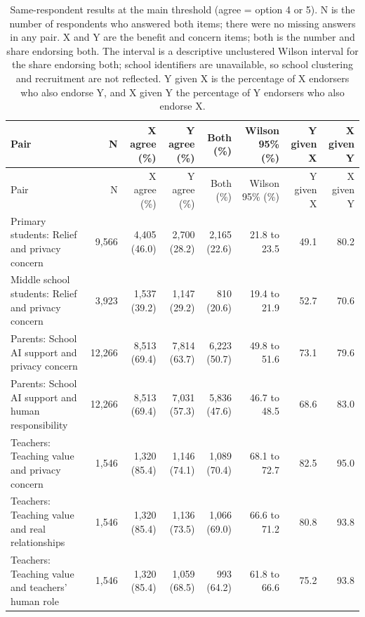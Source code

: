 \begin{longtable}{@{}p{}rrrrrrr@{}}
\caption{Same-respondent results at the main threshold (agree = option 4 or 5). N is the number of respondents who answered both items; there were no missing answers in any pair. X and Y are the benefit and concern items; both is the number and share endorsing both. The interval is a descriptive unclustered Wilson interval for the share endorsing both; school identifiers are unavailable, so school clustering and recruitment are not reflected. Y given X is the percentage of X endorsers who also endorse Y, and X given Y the percentage of Y endorsers who also endorse X.}\label{tab:joint_main}\\
\toprule Pair & N & X agree (\%) & Y agree (\%) & Both (\%) & Wilson 95\% (\%) & Y given X & X given Y \\ \midrule \endfirsthead
\toprule Pair & N & X agree (\%) & Y agree (\%) & Both (\%) & Wilson 95\% (\%) & Y given X & X given Y \\ \midrule \endhead
\bottomrule \endfoot
Primary students: Relief and privacy concern & 9{,}566 & 4{,}405 (46.0) & 2{,}700 (28.2) & 2{,}165 (22.6) & 21.8 to 23.5 & 49.1 & 80.2 \\
Middle school students: Relief and privacy concern & 3{,}923 & 1{,}537 (39.2) & 1{,}147 (29.2) & 810 (20.6) & 19.4 to 21.9 & 52.7 & 70.6 \\
Parents: School AI support and privacy concern & 12{,}266 & 8{,}513 (69.4) & 7{,}814 (63.7) & 6{,}223 (50.7) & 49.8 to 51.6 & 73.1 & 79.6 \\
Parents: School AI support and human responsibility & 12{,}266 & 8{,}513 (69.4) & 7{,}031 (57.3) & 5{,}836 (47.6) & 46.7 to 48.5 & 68.6 & 83.0 \\
Teachers: Teaching value and privacy concern & 1{,}546 & 1{,}320 (85.4) & 1{,}146 (74.1) & 1{,}089 (70.4) & 68.1 to 72.7 & 82.5 & 95.0 \\
Teachers: Teaching value and real relationships & 1{,}546 & 1{,}320 (85.4) & 1{,}136 (73.5) & 1{,}066 (69.0) & 66.6 to 71.2 & 80.8 & 93.8 \\
Teachers: Teaching value and teachers' human role & 1{,}546 & 1{,}320 (85.4) & 1{,}059 (68.5) & 993 (64.2) & 61.8 to 66.6 & 75.2 & 93.8 \\
\end{longtable}

